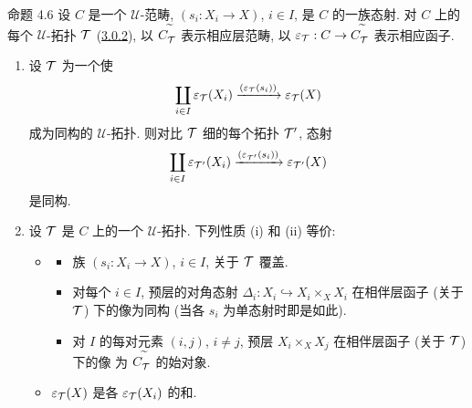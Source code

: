 \begin{enonce*}{命题 4.6}
设 $C$ 是一个 $𝒰$-范畴,
$(s_i:X_i\rightarrow X)$, $i\in I$, 是 $C$ 的一族态射.
对 $C$ 上的每个 $𝒰$-拓扑 ${\mathcal T}$ (\hyperref[II.def3.0.2]{3.0.2}),
以 $C^{\widetilde{\phantom{,}}}_{{\mathcal T}}$ 表示相应层范畴,
以 $\varepsilon_{{\mathcal T}}:C\rightarrow
C^{\widetilde{\phantom{,}}}_{{\mathcal T}}$ 表示相应函子.
\begin{enumerate}
\renewcommand{\labelenumi}{\theenumi)}
\item 设 ${\mathcal T}$ 为一个使
$$
\coprod_{i\in I}
\varepsilon_{{\mathcal T}}(X_i)\xrightarrow{(\varepsilon_{{\mathcal T}}(s_i))}\varepsilon_{{\mathcal T}}(X)
$$
成为同构的 $𝒰$-拓扑.
则对比 ${\mathcal T}$ 细的每个拓扑 ${\mathcal T}'$, 态射
$$
\coprod_{i\in
  I}\varepsilon_{{\mathcal T}'}(X_i)\xrightarrow{(\varepsilon_{{\mathcal T}'}(s_i))}\varepsilon_{{\mathcal T}'}(X)
$$
是同构.

\item 设 ${\mathcal T}$ 是 $C$ 上的一个 $𝒰$-拓扑.
下列性质 {\rm(i)} 和 {\rm(ii)} 等价:
\begin{itemize}
\item[i)]
\begin{itemize}
\item[a)] 族 $(s_i:X_i\rightarrow X)$, $i\in I$, 关于 ${\mathcal T}$ 覆盖.

\item[b)] 对每个 $i\in I$, 预层的对角态射
$\Delta_i:X_i\hookrightarrow X_i\times_X X_i$\pageoriginale{}
在相伴层函子 (关于 ${\mathcal T}$) 下的像为同构
(当各 $s_i$ 为单态射时即是如此).

\item[c)] 对 $I$ 的每对元素 $(i,j)$, $i\neq j$,
预层 $X_i\times_X X_j$ 在相伴层函子 (关于 ${\mathcal T}$) 下的像
为 $C^{\widetilde{\phantom{,}}}_{{\mathcal T}}$ 的始对象.
\end{itemize}
\item[ii)] $\varepsilon_{{\mathcal T}}(X)$ 是各 $\varepsilon_{{\mathcal T}}(X_i)$ 的和.
\end{itemize}
\end{enumerate}
\end{enonce*}

